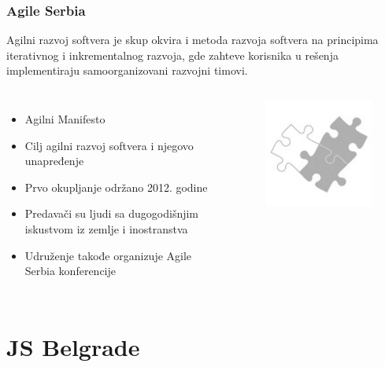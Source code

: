 \documentclass[hyperref={bookmarks=false},aspectratio=169]{beamer}
\begin{document}
\begin{frame}
\frametitle{Agile Serbia}

Agilni razvoj softvera je skup okvira i metoda razvoja softvera na principima iterativnog i inkrementalnog razvoja, gde zahteve korisnika u rešenja implementiraju samoorganizovani razvojni timovi.


\begin{columns}[T]

\begin{itemize}
    \item Agilni Manifesto
    \item Cilj agilni razvoj softvera i njegovo unapređenje
    \item Prvo okupljanje održano 2012. godine
    \item Predavači su ljudi sa dugogodišnjim iskustvom iz zemlje i inostranstva
    \item Udruženje takođe organizuje Agile Serbia konferencije 
\end{itemize}



\begin{figure}
    \raggedleft
    \includegraphics[scale=0.4]{./images/agile_srb.png}
\end{figure}

\end{columns}
\end{frame}

\section{JS Belgrade}
\end{document}
